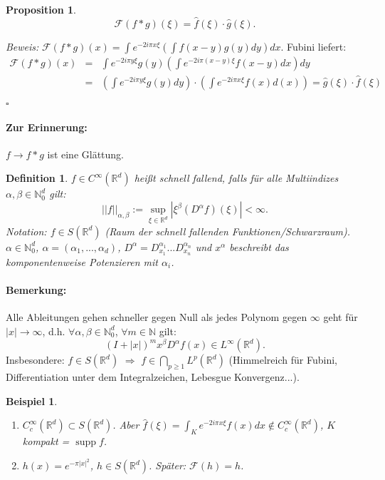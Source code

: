 \documentclass[11pt,a4paper,titlepage, ngerman]{scrartcl}
\newtheorem{Definition}[Satz]{Definition}
\newtheorem{Beispiel}[Satz]{Beispiel}
\newtheorem{Prop}[Satz]{Proposition}
\DeclareMathOperator{\supp}{supp}
\numberwithin{equation}{section}
\newcommand{\R}{\mathbb{R}} %
\newcommand{\N}{\mathbb{N}} %
\newcommand{\f}{\hat{f}}
\newcommand{\g}{\hat{g}}
\newcommand{\F}{\mathcal{F}}
\newcommand{\m}{\cdot}
\newcommand{\Bew}{\emph{Beweis: }}
\newcommand{\qed}{\begin{flushright}
		$\square$
	\end{flushright}}
\begin{document}
	\begin{Prop}
		$$\F(f*g)(\xi) = \f(\xi)\m \g(\xi).$$
	\end{Prop}
	
	\Bew $\F(f*g)(x) = \int e^{-2i\pi x\xi}(\int f(x-y)g(y)dy)dx$. Fubini liefert:
	\begin{eqnarray}
		\F(f*g)(x) &=& \int e^{-2i\pi y\xi}g(y) (\int e^{-2i\pi (x-y)\xi}f(x-y)dx)dy\nonumber\\
		&=&(\int e^{-2i\pi y\xi}g(y)dy)\m(\int e^{-2i\pi x\xi}f(x)d(x)) = \g(\xi)\m \f(\xi)\nonumber
	\end{eqnarray}
	\qed
	
	\paragraph{Zur Erinnerung:} $f\rightarrow f*g$ ist eine Glättung.
	
	\begin{Definition}
		$f\in C^{\infty}(\R^d)$ heißt schnell fallend, falls für alle Multiindizes $\alpha,\beta \in \N_0^d$ gilt: 
		$$||f||_{\alpha,\beta} := \sup_{\xi\in \R^d}|\xi^\beta(D^\alpha f)(\xi)| <\infty.$$
		Notation: $f\in S(\R^d)$ (Raum der schnell fallenden Funktionen/Schwarzraum). $\alpha\in \N_0^d$, $\alpha = (\alpha_1,...,\alpha_d)$, $D^\alpha = D_{x_1}^{\alpha_1}...D_{x_n}^{\alpha_n}$ und $x^\alpha$ beschreibt das komponentenweise Potenzieren mit $\alpha_i$.
	\end{Definition}
	
	\paragraph{Bemerkung:} Alle Ableitungen gehen schneller gegen Null als jedes Polynom gegen $\infty$ geht für $|x|\rightarrow \infty$, d.h. $\forall\alpha,\beta\in \N_0^d$, $\forall m\in \N$ gilt:
	$$(I+|x|)^m x^\beta D^\alpha f(x)\in L^\infty(\R^d).$$
	Insbesondere: $f\in S(\R^d)$ $\Rightarrow$ $f\in \bigcap_{p\geq 1} L^p(\R^d)$ (Himmelreich für Fubini, Differentiation unter dem Integralzeichen, Lebesgue Konvergenz...).
	
	\begin{Beispiel}
		~
		\begin{enumerate}
			\item[a)] $C_c^{\infty}(\R^d)\subset S(\R^d)$. Aber $\f(\xi) = \int_K e^{-2i\pi x\xi}f(x) dx\notin C_c^{\infty}(\R^d)$, $K$ kompakt = $\supp f$.
			\item[b)] $h(x) = e^{-\pi|x|^2}$, $h\in S(\R^d)$. Später: $\F(h) = h$.
		\end{enumerate}
	\end{Beispiel}
	
\end{document}
